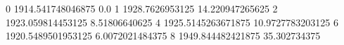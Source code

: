 0 1914.541748046875 0.0
1 1928.7626953125 14.220947265625
2 1923.059814453125 8.51806640625
4 1925.5145263671875 10.9727783203125
6 1920.5489501953125 6.0072021484375
8 1949.844482421875 35.302734375
